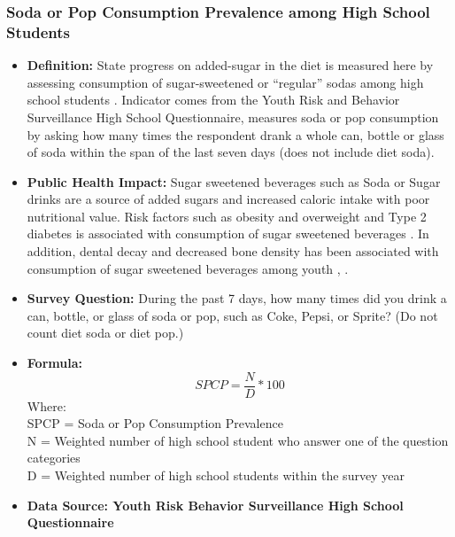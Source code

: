 \documentclass[12pt,letterpaper]{report}
\begin{document}
		\subsubsection{Soda or Pop Consumption Prevalence among High School Students} 
	\begin{itemize}
		\item \textbf{Definition:} State progress on added-sugar in the diet is measured here by assessing consumption of sugar-sweetened or “regular” sodas among high school students \cite{CDCFoodEnvt2011}. Indicator comes from the Youth Risk and Behavior Surveillance High School Questionnaire, measures soda or pop consumption by asking how many times the respondent drank a whole can, bottle or glass of soda within the span of the last seven days (does not include diet soda).
		\item \textbf{Public Health Impact:} Sugar sweetened beverages such as Soda or Sugar drinks are a source of added sugars and increased caloric intake with poor nutritional value. Risk factors such as obesity and overweight and Type 2 diabetes is associated with consumption of sugar sweetened beverages \cite{vartanian2007effects}. In addition, dental decay and decreased bone density has been associated with consumption of sugar sweetened beverages among youth \cite{whiting2001relationship}, \cite{tahmassebi2006soft}.
		\item \textbf{Survey Question:} During the past 7 days, how many times did you drink a can, bottle, or glass of soda or pop, such as Coke, Pepsi, or Sprite? (Do not count diet soda or diet pop.)

		\item \textbf{Formula:} 
			\begin{equation}
				SPCP = \frac{N}{D} *100
			\end{equation} 
Where: \\
			SPCP = Soda or Pop Consumption Prevalence\\
			
			N = Weighted number of high school student who answer one of the question categories\\
			
			D = Weighted number of high school students within the survey year \\
			
		\item \textbf{Data Source: Youth Risk Behavior Surveillance High School Questionnaire}
	\end{itemize}
\end{document}
